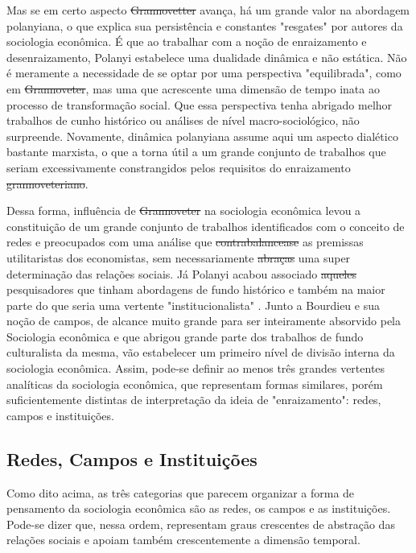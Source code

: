 Mas se em certo aspecto \sout{Grannovetter} avança, há um grande valor na
abordagem polanyiana, o que explica sua persistência e constantes 
"resgates" por autores da sociologia econômica. É que ao trabalhar
com a noção de enraizamento e desenraizamento, Polanyi estabelece uma
dualidade dinâmica e não estática. Não é meramente a necessidade de se optar por
uma perspectiva "equilibrada", como em \sout{Grannoveter}, mas uma que acrescente uma dimensão de tempo inata ao processo de transformação social. Que essa perspectiva tenha abrigado melhor trabalhos de cunho
histórico ou análises de nível macro-sociológico, não surpreende. Novamente, 
dinâmica polanyiana assume aqui um aspecto dialético bastante marxista, o que a torna útil a um grande conjunto de trabalhos
que seriam excessivamente constrangidos pelos requisitos do enraizamento \sout{grannoveteriano}.

Dessa forma,  influência de \sout{Grannoveter} na sociologia econômica levou a constituição de um grande conjunto de trabalhos identificados com o conceito de redes e preocupados com uma análise que \sout{contrabalancease} as premissas utilitaristas dos economistas, sem necessariamente \sout{abraças} uma super determinação das relações sociais. Já Polanyi acabou associado \sout{aqueles} pesquisadores que tinham abordagens de fundo histórico  e também na maior parte do que seria uma vertente "institucionalista" . Junto a Bourdieu e sua noção de campos, de alcance muito grande para ser inteiramente absorvido pela Sociologia econômica e que abrigou grande parte dos trabalhos de fundo culturalista da mesma, vão estabelecer um primeiro nível de divisão interna da sociologia econômica. Assim, pode-se definir ao menos três grandes vertentes analíticas da sociologia econômica, que representam formas similares, porém suficientemente distintas de interpretação da ideia de "enraizamento": redes, campos e instituições.

\subsection{Redes, Campos e Instituições}
Como dito acima, as três categorias que parecem organizar a forma
de pensamento da sociologia econômica são as redes, os campos e as
instituições. Pode-se dizer que, nessa ordem, representam graus crescentes de abstração das relações sociais e apoiam também crescentemente a dimensão temporal.

